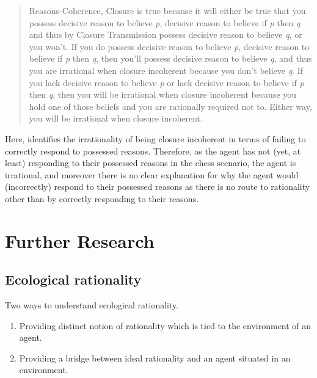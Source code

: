 \documentclass[10pt]{article}
\begin{document}
\begin{quote}
  Reasons-Coherence, Closure is true because it will either be true that you possess decisive reason to believe \emph{p}, decisive reason to believe if \emph{p} then \emph{q} and thus by Closure Transmission possess decisive reason to believe \emph{q}, or you won't.
  If you do possess decisive reason to believe \emph{p}, decisive reason to believe if \emph{p} then \emph{q}, then you'll possess decisive reason to believe \emph{q}, and thus you are irrational when closure incoherent because you don't believe \emph{q}.
  If you lack decisive reason to believe \emph{p} or lack decisive reason to believe if \emph{p} then \emph{q}, then you will be irrational when closure incoherent because you hold one of those beliefs and you are rationally required not to.
  Either way, you will be irrational when closure incoherent.
\end{quote}

Here, \citeauthor{Lord:2018aa} identifies the irrationality of being closure incoherent in terms of failing to correctly respond to possessed reasons.
Therefore, as the agent has not (yet, at least) responding to their possessed reasons in the chess scenario, the agent is irrational, and moreover there is no clear explanation for why the agent would (incorrectly) respond to their possessed reasons as there is no route to rationality other than by correctly responding to their reasons.




\section{Further Research}
\label{sec:further-research}

\subsection{Ecological rationality}
\label{sec:ecol-rati}

Two ways to understand ecological rationality.
\begin{enumerate}
\item Providing distinct notion of rationality which is tied to the environment of an agent.
\item Providing a bridge between ideal rationality and an agent situated in an environment.
\end{enumerate}


\newpage

\printbibliography
\end{document}
